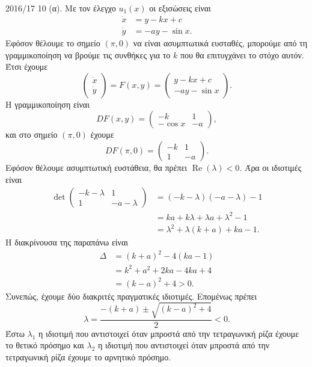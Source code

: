 \begin{solution}{2016/17 10}
    (α). Με τον έλεγχο \( u_1(x) \) οι εξισώσεις είναι
    \begin{align*}
        \dot{x} &= y -kx + c\\
        \dot{y} &= -a y - \sin{x}.
    \end{align*}
    Εφόσον θέλουμε το σημείο \( (\pi, 0) \) να είναι ασυμπτωτικά ευσταθές,
    μπορούμε από τη γραμμικοποίηση να βρούμε τις συνθήκες για το \( k \) που θα
    επιτυγχάνει το στόχο αυτόν. Έτσι έχουμε
    \[
        \begin{pmatrix}
            \dot{x} \\
            \dot{y}
        \end{pmatrix} = F(x, y) =
        \begin{pmatrix}
            y -kx + c \\
            -a y - \sin{x}
        \end{pmatrix}.
    \]
    Η γραμμικοποίηση είναι
    \[
        DF(x, y) =
        \begin{pmatrix}
            -k & 1 \\
            -\cos{x} & -a
        \end{pmatrix},
    \]
    και στο σημείο \( (\pi, 0) \) έχουμε
    \[
        DF(\pi, 0) =
        \begin{pmatrix}
            -k & 1 \\
            1 & -a
        \end{pmatrix}.
    \]
    Εφόσον θέλουμε ασυμπτωτική ευστάθεια, θα πρέπει \(
    \operatorname{Re}(\lambda) < 0 \). Άρα οι ιδιοτιμές είναι
    \begin{align*}
        \det{\begin{pmatrix}
                -k - \lambda & 1 \\
                1 & -a - \lambda
        \end{pmatrix}} &=
        (-k - \lambda)(-a - \lambda) - 1 \\
        &= ka + k\lambda + \lambda a + \lambda^2 - 1 \\
        &= \lambda^2 + \lambda(k + a) + ka - 1.
    \end{align*}
    Η διακρίνουσα της παραπάνω είναι
    \begin{align*}
        \Delta &= (k + a)^2 - 4(ka - 1) \\
        &= k^2 + a^2 + 2ka - 4ka + 4 \\
        &= (k - a)^2 + 4 > 0.
    \end{align*}
    Συνεπώς, έχουμε δύο διακριτές πραγματικές ιδιοτιμές. Επομένως πρέπει
    \[
        \lambda = \frac{-(k + a) \pm\sqrt{(k -a)^2 + 4}}{2} < 0.
    \]
    Έστω \( \lambda_1 \) η ιδιοτιμή που αντιστοιχεί όταν μπροστά από την
    τετραγωνική ρίζα έχουμε το θετικό πρόσημο και \( \lambda_2 \) η ιδιοτιμή
    που αντιστοιχεί όταν μπροστά από την τετραγωνική ρίζα έχουμε το αρνητικό
    πρόσημο.


\end{solution}
